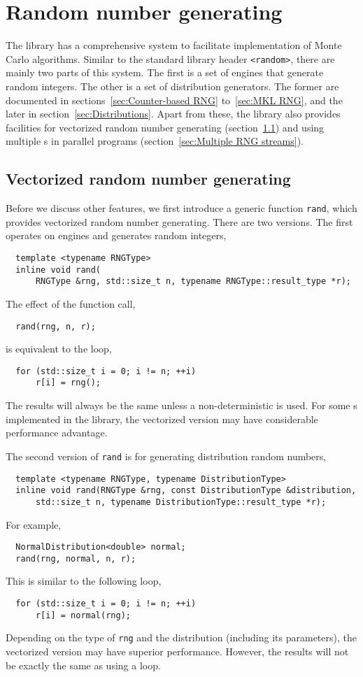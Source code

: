 \chapter{Random number generating}
\label{chap:Random number generating}

The library has a comprehensive \rng system to facilitate implementation of
Monte Carlo algorithms. Similar to the standard library header \verb|<random>|,
there are mainly two parts of this system. The first is a set of \rng{} engines
that generate random integers. The other is a set of distribution generators.
The former are documented in sections~\ref{sec:Counter-based RNG}
to~\ref{sec:MKL RNG}, and the later in section~\ref{sec:Distributions}. Apart
from these, the library also provides facilities for vectorized random number
generating (section~\ref{sec:Vectorized random number generating}) and using
multiple \rng{}s in parallel programs (section~\ref{sec:Multiple RNG streams}).

\section{Vectorized random number generating}
\label{sec:Vectorized random number generating}

Before we discuss other features, we first introduce a generic function
\verb|rand|, which provides vectorized random number generating. There are two
versions. The first operates on \rng engines and generates random integers,
\begin{Verbatim}
  template <typename RNGType>
  inline void rand(
      RNGType &rng, std::size_t n, typename RNGType::result_type *r);
\end{Verbatim}
The effect of the function call,
\begin{Verbatim}
  rand(rng, n, r);
\end{Verbatim}
is equivalent to the loop,
\begin{Verbatim}
  for (std::size_t i = 0; i != n; ++i)
      r[i] = rng();
\end{Verbatim}
The results will always be the same unless a non-deterministic \rng is used.
For some \rng{}s implemented in the library, the vectorized version may have
considerable performance advantage.

The second version of \verb|rand| is for generating distribution random
numbers,
\begin{Verbatim}
  template <typename RNGType, typename DistributionType>
  inline void rand(RNGType &rng, const DistributionType &distribution,
      std::size_t n, typename DistributionType::result_type *r);
\end{Verbatim}
For example,
\begin{Verbatim}
  NormalDistribution<double> normal;
  rand(rng, normal, n, r);
\end{Verbatim}
This is similar to the following loop,
\begin{Verbatim}
  for (std::size_t i = 0; i != n; ++i)
      r[i] = normal(rng);
\end{Verbatim}
Depending on the type of \verb|rng| and the distribution (including its
parameters), the vectorized version may have superior performance. However, the
results will not be exactly the same as using a loop.


